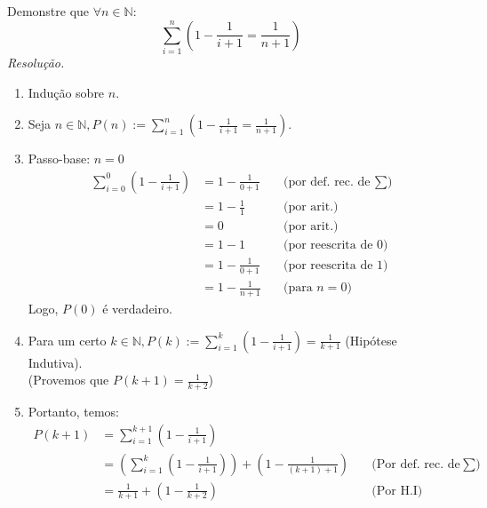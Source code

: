 Demonstre que $\forall n \in \mathbb{N}$:
\begin{displaymath}
	\sum\limits_{i=1}^n (1 - \frac{1}{i + 1} = \frac{1}{n + 1})
\end{displaymath}
\emph{Resolução.} 
\begin{enumerate}
	\item Indução sobre $n$.
	\item Seja $n \in \mathbb{N}, P(n) :=  \sum\limits_{i=1}^n (1 - \frac{1}{i + 1} = \frac{1}{n + 1})$.
	\item Passo-base: $n = 0$
	\begin{align*}
		\sum\limits_{i=0}^0 (1 - \frac{1}{i + 1}) &= 1 - \frac{1}{0 + 1} &\quad \text{(por def. rec. de $\sum$)} \\
		&= 1 - \frac{1}{1} &\quad \text{(por arit.)} \\
		&= 0 &\quad \text{(por arit.)} \\
		&= 1 - 1 &\quad \text{(por reescrita de 0)} \\
		&= 1 - \frac{1}{0 + 1} &\quad \text{(por reescrita de 1)} \\
		&= 1 - \frac{1}{n + 1} &\quad \text{(para $n = 0$)}
	\end{align*}
	Logo, $P(0)$ é verdadeiro.
	\item Para um certo $k \in \mathbb{N}, P(k) := \sum\limits_{i=1}^k (1 - \frac{1}{i + 1}) = \frac{1}{k + 1}$ (Hipótese Indutiva). \\
	(Provemos que $P(k + 1) = \frac{1}{k + 2}$)
	\item Portanto, temos:
	\begin{align*}
		P(k + 1) &= \sum\limits_{i=1}^{k + 1} (1 - \frac{1}{i + 1}) \\
		&= (\sum\limits_{i=1}^{k} (1 - \frac{1}{i + 1})) + (1 - \frac{1}{(k + 1) + 1}) &\quad \text{(Por def. rec. de $\sum$)} \\
		&= \frac{1}{k + 1} + (1 - \frac{1}{k + 2}) &\quad \text{(Por H.I)}
	\end{align*}
\end{enumerate}
